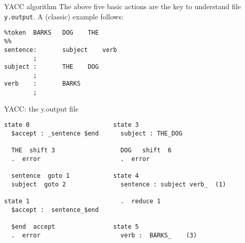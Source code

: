 \begin{frame}[fragile]{YACC algorithm}
The above five basic actions are the key to understand file
{\tt y.output}.
A (classic) example follows:


\vspace{20pt}

\begin{verbatim}
%token  BARKS   DOG    THE
%%
sentence:       subject    verb
        ;
subject :       THE    DOG
        ;
verb    :       BARKS
        ;
\end{verbatim}

\end{frame}

\begin{frame}[fragile]{YACC: the y.output file}
\begin{verbatim}
state 0                       state 3
  $accept : _sentence $end      subject : THE_DOG

  THE  shift 3                  DOG   shift  6
  .  error                      .  error

  sentence  goto 1            state 4
  subject  goto 2               sentence : subject verb_  (1)

state 1                         .  reduce 1
  $accept :  sentence_$end 

  $end  accept                state 5
  .  error                      verb :  BARKS_    (3)
\end{verbatim}
\end{frame}

